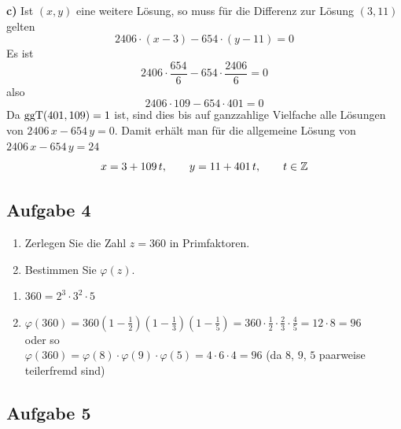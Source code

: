\begin{loesung}
\textbf{c)} Ist $(x, y)$ eine weitere Lösung, so muss für die Differenz zur Lösung $(3, 11)$ gelten
\[ 2406 \cdot (x - 3) - 654 \cdot (y - 11) = 0 \]
Es ist
\[ 2406 \cdot \frac{654}{6} - 654 \cdot \frac{2406}{6} = 0 \]
also
\[ 2406 \cdot 109 - 654 \cdot 401 = 0 \]
Da $\operatorname{ggT}(401, 109) = 1$ ist, sind dies bis auf ganzzahlige Vielfache alle Lösungen von $2406\,x - 654\,y = 0$.
Damit erhält man für die allgemeine Lösung von $2406\,x - 654\,y = 24$
\[ x = 3 + 109\,t, \qquad y = 11 + 401\,t, \qquad t \in \mathbb{Z} \]
\end{loesung}

\subsection{Aufgabe 4}

\begin{aufgabe}[Aufgabe 4]
\begin{enumerate}[label=\alph*)]
\item Zerlegen Sie die Zahl $z = 360$ in Primfaktoren.
\item Bestimmen Sie $\varphi(z)$.
\end{enumerate}
\end{aufgabe}

\begin{loesung}
\begin{enumerate}[label=\alph*)]
\item $360 = 2^3 \cdot 3^2 \cdot 5$
\item $\varphi(360) = 360 \left(1 - \frac{1}{2}\right)\left(1 - \frac{1}{3}\right)\left(1 - \frac{1}{5}\right) = 360 \cdot \frac{1}{2} \cdot \frac{2}{3} \cdot \frac{4}{5} = 12 \cdot 8 = 96$\\
oder so\\
$\varphi(360) = \varphi(8) \cdot \varphi(9) \cdot \varphi(5) = 4 \cdot 6 \cdot 4 = 96$ \quad (da $8$, $9$, $5$ paarweise teilerfremd sind)
\end{enumerate}
\end{loesung}

\subsection{Aufgabe 5}

